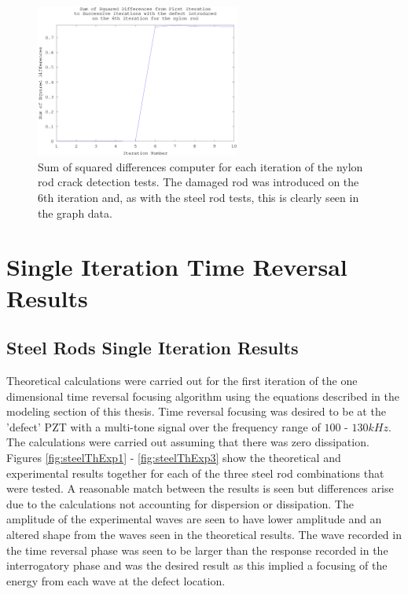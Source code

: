\begin{figure}[ht!]
\centering
\includegraphics[width=0.6\textwidth]{eps_pics/nylonDifferences}
\caption{Sum of squared differences computer for each iteration of the nylon rod crack detection tests. The damaged rod was introduced on the 6th iteration and, as with the steel rod tests, this is clearly seen in the graph data.
 	 \label{fig:nylonDifferences}} 
\end{figure}

\section{Single Iteration Time Reversal Results}

\subsection{Steel Rods Single Iteration Results}
Theoretical calculations were carried out for the first iteration of the one dimensional time reversal focusing algorithm using the equations described in the modeling section of this thesis. Time reversal focusing was desired to be at the 'defect' PZT with a multi-tone signal over the frequency range of $100$ - $130kHz$. The calculations were carried out assuming that there was zero dissipation. Figures \ref{fig:steelThExp1} - \ref{fig:steelThExp3} show the theoretical and experimental results together for each of the three steel rod combinations that were tested. A reasonable match between the results is seen but differences arise due to the calculations not accounting for dispersion or dissipation. The amplitude of the experimental waves are seen to have lower amplitude and an altered shape from the waves seen in the theoretical results. The wave recorded in the time reversal phase was seen to be larger than the response recorded in the interrogatory phase and was the desired result as this implied a focusing of the energy from each wave at the defect location.

